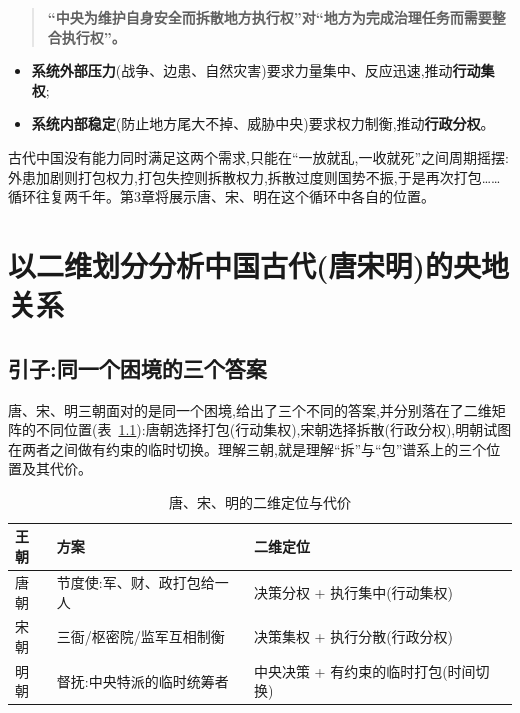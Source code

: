 \documentclass[UTF8,12pt,a4paper]{ctexrep}
\begin{document}
\begin{quote}
  \textbf{``中央为维护自身安全而拆散地方执行权''对``地方为完成治理任务而需要整合执行权''。}
\end{quote}

\begin{itemize}
  \item \textbf{系统外部压力}(战争、边患、自然灾害)要求力量集中、反应迅速,推动\textbf{行动集权};
  \item \textbf{系统内部稳定}(防止地方尾大不掉、威胁中央)要求权力制衡,推动\textbf{行政分权}。
\end{itemize}

古代中国没有能力同时满足这两个需求,只能在``一放就乱,一收就死''之间周期摇摆:外患加剧则打包权力,打包失控则拆散权力,拆散过度则国势不振,于是再次打包……循环往复两千年。第3章将展示唐、宋、明在这个循环中各自的位置。

\chapter{以二维划分分析中国古代(唐宋明)的央地关系}

\section{引子:同一个困境的三个答案}

唐、宋、明三朝面对的是同一个困境,给出了三个不同的答案,并分别落在了二维矩阵的不同位置(表~\ref{tab:three}):唐朝选择打包(行动集权),宋朝选择拆散(行政分权),明朝试图在两者之间做有约束的临时切换。理解三朝,就是理解``拆''与``包''谱系上的三个位置及其代价。

\begin{table}[htbp]
  \centering
  \small
  \caption{唐、宋、明的二维定位与代价}
  \label{tab:three}
  \begin{tabularx}{\linewidth}{@{}lXX@{}}
    \toprule
    \textbf{王朝} & \textbf{方案} & \textbf{二维定位} \\
    \midrule
    唐朝 & 节度使:军、财、政打包给一人 & 决策分权 + 执行集中(行动集权) \\
    宋朝 & 三衙/枢密院/监军互相制衡 & 决策集权 + 执行分散(行政分权) \\
    明朝 & 督抚:中央特派的临时统筹者 & 中央决策 + 有约束的临时打包(时间切换) \\
    \bottomrule
  \end{tabularx}
\end{table}
\end{document}
